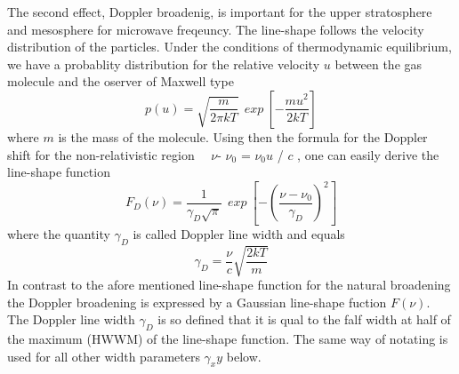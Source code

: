 The second effect, Doppler broadenig, is important for the upper
stratosphere and mesosphere for microwave freqeuncy. The line-shape
follows the velocity distribution of the particles. Under the conditions
of thermodynamic equilibrium, we have  a probablity distribution for
the relative velocity $u$ between the gas molecule and the oserver 
of Maxwell type 
\begin{equation}
  p(u)=\sqrt{\frac{m}{2\pi kT}}~~exp~\left[-\frac{mu^2}{2kT}\right]
\label{}
\end{equation}
where $m$ is the mass of the molecule. Using then the formula for the
Doppler shift for the non-relativistic region~~  $\nu$- $\nu_0$ =
$\nu_0$$u$ / $c$ , one can easily derive the line-shape function 
\begin{equation}
 F_D(\nu)=\frac{1}{\gamma_D\sqrt{\pi}}~~exp~\left[-\left(\frac{\nu - \nu_0}{\gamma_D}\right)^2\right]
\label{}
\end{equation}
where the quantity $\gamma_D$ is called Doppler line width and equals
\begin{equation}
 \gamma_D=\frac{\nu}{c}\sqrt{\frac{2kT}{m}}
\label{}
\end{equation}
In contrast to the afore mentioned line-shape function for the natural
broadening the Doppler broadening is expressed by a Gaussian
line-shape fuction $F(\nu)$. The Doppler line width $\gamma_D$ is so
defined that it is qual to the falf width at half of the maximum
(HWWM) of the line-shape function. The same way of notating is used
for all other width parameters $\gamma_xy$ below.


